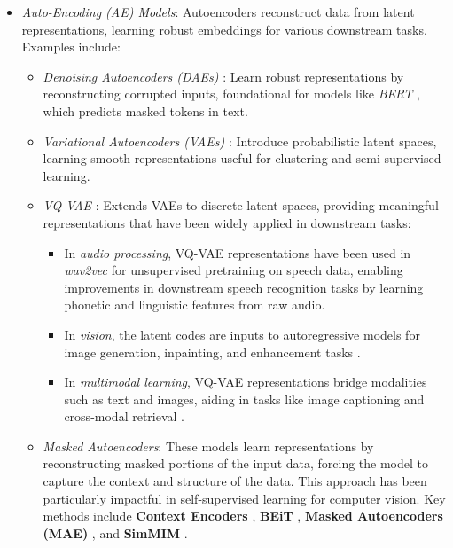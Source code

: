 \begin{itemize}
    
    \item \emph{Auto-Encoding (AE) Models}: Autoencoders reconstruct data from latent representations, learning robust embeddings for various downstream tasks. Examples include:
    \begin{itemize}
        \item \emph{Denoising Autoencoders (DAEs)} \citep{vincent2008extracting}: Learn robust representations by reconstructing corrupted inputs, foundational for models like \emph{BERT} \citep{devlin2019bert}, which predicts masked tokens in text.
        \item \emph{Variational Autoencoders (VAEs)} \citep{kingma2013auto}: Introduce probabilistic latent spaces, learning smooth representations useful for clustering and semi-supervised learning.
        \item \emph{VQ-VAE} \citep{oord2017neural}: Extends VAEs to discrete latent spaces, providing meaningful representations that have been widely applied in downstream tasks:
        \begin{itemize}
            \begin{itemize}
            \item In \textit{audio processing}, VQ-VAE representations have been used in \textit{wav2vec} \citep{baevski2020wav2vec} for unsupervised pretraining on speech data, enabling improvements in downstream speech recognition tasks by learning phonetic and linguistic features from raw audio.
            \item In \textit{vision}, the latent codes are inputs to autoregressive models for image generation, inpainting, and enhancement tasks \citep{razavi2019generating}.
            \item In \textit{multimodal learning}, VQ-VAE representations bridge modalities such as text and images, aiding in tasks like image captioning and cross-modal retrieval \citep{ding2021vqvae}.
        \end{itemize}
        \end{itemize}
        \item \emph{Masked Autoencoders}: These models learn representations by reconstructing masked portions of the input data, forcing the model to capture the context and structure of the data. This approach has been particularly impactful in self-supervised learning for computer vision. Key methods include \textbf{Context Encoders} \citep{pathak2016context}, \textbf{BEiT} \citep{bao2021beit}, \textbf{Masked Autoencoders (MAE)} \citep{he2022masked}, and \textbf{SimMIM} \citep{xie2022simmim}. %



\end{itemize}
\end{itemize}
